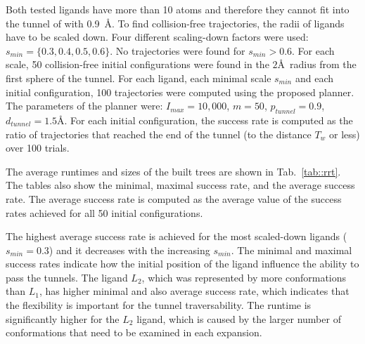 \documentclass{svmult}
\def\dt{d_{tunnel}}
\def\rv{T_w}
\def\Imax{I_{max}} %
\def\smin{s_{min}}
\def\gb{p_{tunnel}}
\def\LA{L_1}
\def\LB{L_2}
\begin{document}
Both tested ligands have more than 10 atoms and therefore they cannot fit into the tunnel of with 0.9~\AA.
To find collision-free trajectories, the radii of ligands have to be scaled down. 
Four different scaling-down factors were used: $\smin=\{0.3,0.4,0.5,0.6\}$.
No trajectories were found for $\smin > 0.6$.
For each scale, 50 collision-free initial configurations were found in the $2$\AA\ radius from the first sphere of the tunnel.
For each ligand, each minimal scale $\smin$ and each initial configuration, 100 trajectories were computed using the proposed planner.
The parameters of the planner were: $\Imax=10,000$, $m=50$, $\gb=0.9$, $\dt=1.5$\AA.
For each initial configuration, the success rate is computed as the ratio of trajectories that reached the end of the tunnel (to the distance $\rv$ or less) over 100 trials.

The average runtimes and sizes of the built trees are shown in Tab.~\ref{tab::rrt}.
The tables also show the minimal, maximal success rate, and the average success rate.
The average success rate is computed as the average value of the success rates achieved for all 50 initial configurations.

The highest average success rate is achieved for the most scaled-down ligands ($\smin=0.3$) and it decreases with the increasing $\smin$. 
The minimal and maximal success rates indicate how the initial position of the ligand influence the ability to pass the tunnels.
The ligand $\LB$, which was represented by more conformations than $\LA$, has higher minimal and also average success rate, which
indicates that the flexibility is important for the tunnel traversability.
The runtime is significantly higher for the $\LB$ ligand, which is caused by the larger number of conformations that need to be
examined in each expansion.


\def\tmpa{0.13\textwidth}
\end{document}
